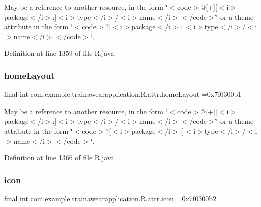 May be a reference to another resource, in the form \char`\"{}$<$code$>$@\mbox{[}+\mbox{]}\mbox{[}$<$i$>$package$<$/i$>$\+:\mbox{]}$<$i$>$type$<$/i$>$/$<$i$>$name$<$/i$>$$<$/code$>$\char`\"{} or a theme attribute in the form \char`\"{}$<$code$>$?\mbox{[}$<$i$>$package$<$/i$>$\+:\mbox{]}$<$i$>$type$<$/i$>$/$<$i$>$name$<$/i$>$$<$/code$>$\char`\"{}. 

Definition at line 1359 of file R.\+java.

\mbox{\label{classcom_1_1example_1_1trainawearapplication_1_1_r_1_1attr_a4585ece800fefe82fba75125a454aacc}} 
\subsubsection{\texorpdfstring{homeLayout}{homeLayout}}
{\footnotesize\ttfamily final int com.\+example.\+trainawearapplication.\+R.\+attr.\+home\+Layout =0x7f0300b1\hspace{0.3cm}{\ttfamily [static]}}

May be a reference to another resource, in the form \char`\"{}$<$code$>$@\mbox{[}+\mbox{]}\mbox{[}$<$i$>$package$<$/i$>$\+:\mbox{]}$<$i$>$type$<$/i$>$/$<$i$>$name$<$/i$>$$<$/code$>$\char`\"{} or a theme attribute in the form \char`\"{}$<$code$>$?\mbox{[}$<$i$>$package$<$/i$>$\+:\mbox{]}$<$i$>$type$<$/i$>$/$<$i$>$name$<$/i$>$$<$/code$>$\char`\"{}. 

Definition at line 1366 of file R.\+java.

\mbox{\label{classcom_1_1example_1_1trainawearapplication_1_1_r_1_1attr_a731d87071cc5f39adf07b4e184d70931}} 
\subsubsection{\texorpdfstring{icon}{icon}}
{\footnotesize\ttfamily final int com.\+example.\+trainawearapplication.\+R.\+attr.\+icon =0x7f0300b2\hspace{0.3cm}{\ttfamily [static]}}

